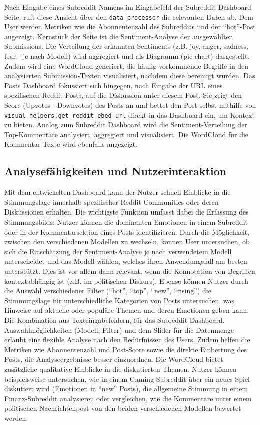 Nach Eingabe eines Subreddit-Namens im Eingabefeld der Subreddit Dashboard Seite, ruft diese Ansicht über den \verb|data_processor| die relevanten Daten ab. Dem User werden Metriken wie die Abonnentenzahl des Subreddits und der \enquote{hot}-Post angezeigt. Kernstück der Seite ist die Sentiment-Analyse der ausgewählten Submissions. Die Verteilung der erkannten Sentiments (z.B. joy, anger, sadness, fear - je nach Modell) wird aggregiert und als Diagramm (pie-chart) dargestellt. Zudem wird eine WordCloud generiert, die häufig vorkommende Begriffe in den analysierten Submission-Texten visualisiert, nachdem diese bereinigt wurden. 
Das Posts Dashboard fokussiert sich hingegen, nach Eingabe der URL eines spezifischen Reddit-Posts, auf die Diskussion unter diesem Post. Sie zeigt den Score (Upvotes - Downvotes) des Posts an und bettet den Post selbst mithilfe von \verb|visual_helpers.get_reddit_ebed_url| direkt in das Dashboard ein, um Kontext zu bieten. Analog zum Subreddit Dashboard wird die Sentiment-Verteilung der Top-Kommentare analysiert, aggregiert und visualisiert. Die WordCloud für die Kommentar-Texte wird ebenfalls angezeigt.

\subsection{Analysefähigkeiten und Nutzerinteraktion}

Mit dem entwickelten Dashboard kann der Nutzer schnell Einblicke in die Stimmungslage innerhalb spezifischer Reddit-Communities oder deren Diskussionen erhalten. Die wichtigste Funktion umfasst dabei die Erfassung des Stimmungsbilds: Nutzer können die dominanten Emotionen in einem Subreddit oder in der Kommentarsektion eines Posts identifizieren. Durch die Möglichkeit, zwischen den verschiedenen Modellen zu wechseln, können User untersuchen, ob sich die Einschätzung der Sentiment-Analyse je nach verwendetem Modell unterscheidet und das Modell wählen, welches ihren Anwendungsfall am besten unterstützt. Dies ist vor allem dann relevant, wenn die Konnotation von Begriffen kontextabhängig ist (z.B. im politischen Diskurs).
Ebenso können Nutzer durch die Auswahl verschiedener Filter (\enquote{hot}, \enquote{top}, \enquote{new}, \enquote{rising}) die Stimmungslage für unterschiedliche Kategorien von Posts untersuchen, was Hinweise auf aktuelle oder populäre Themen und deren Emotionen geben kann. Die Kombination aus Texteingabefeldern, für das Subreddit Dashboard, Auswahlmöglichkeiten (Modell, Filter) und dem Slider für die Datenmenge erlaubt eine flexible Analyse nach den Bedürfnissen des Users. Zudem helfen die Metriken wie Abonnentenzahl und Post-Score sowie die direkte Einbettung des Posts, die Analyseergebnisse besser einzuordnen.
Die WordCloud bietet zusätzliche qualitative Einblicke in die diskutierten Themen. Nutzer können beispielsweise untersuchen, wie in einem Gaming-Subreddit über ein neues Spiel diskutiert wird (Emotionen in \enquote{new} Posts), die allgemeine Stimmung in einem Finanz-Subreddit analysieren oder vergleichen, wie die Kommentare unter einem politischen Nachrichtenpost von den beiden verschiedenen Modellen bewertet werden.

